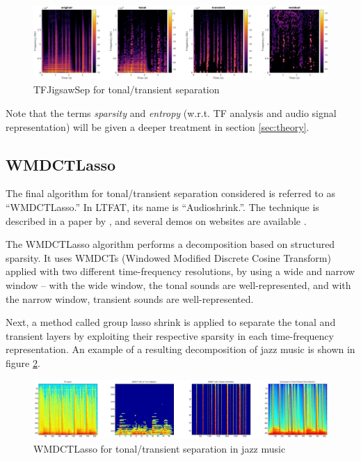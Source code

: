 \documentclass[letter,12pt]{article}
\begin{document}
\begin{figure}[ht]
	\centering
	\includegraphics[width=16cm]{./tfjigsaw-sep-example.png}
	\caption{TFJigsawSep for tonal/transient separation}
	\label{fig:tfjigsawdemo}
\end{figure}

Note that the terms \textit{sparsity} and \textit{entropy} (w.r.t. TF analysis and audio signal representation) will be given a deeper treatment in section \ref{sec:theory}.

\subsection{WMDCTLasso}

The final algorithm for tonal/transient separation considered is referred to as ``WMDCTLasso.'' In LTFAT, its name is ``Audioshrink.''\cite{wmdct3}. The technique is described in a paper by \citet{wmdct}, and several demos on websites are available \cite{wmdct2, wmdct3}.

The WMDCTLasso algorithm performs a decomposition based on structured sparsity. It uses WMDCTs (Windowed Modified Discrete Cosine Transform) applied with two different time-frequency resolutions, by using a wide and narrow window -- with the wide window, the tonal sounds are well-represented, and with the narrow window, transient sounds are well-represented.

Next, a method called group lasso shrink is applied to separate the tonal and transient layers by exploiting their respective sparsity in each time-frequency representation. An example of a resulting decomposition of jazz music is shown in figure \ref{fig:wmdctex}.

\begin{figure}[ht]
	\centering
	\includegraphics[width=16cm]{./wmdctjazz.png}
	\caption{WMDCTLasso for tonal/transient separation in jazz music}
	\label{fig:wmdctex}
\end{figure}
\end{document}
